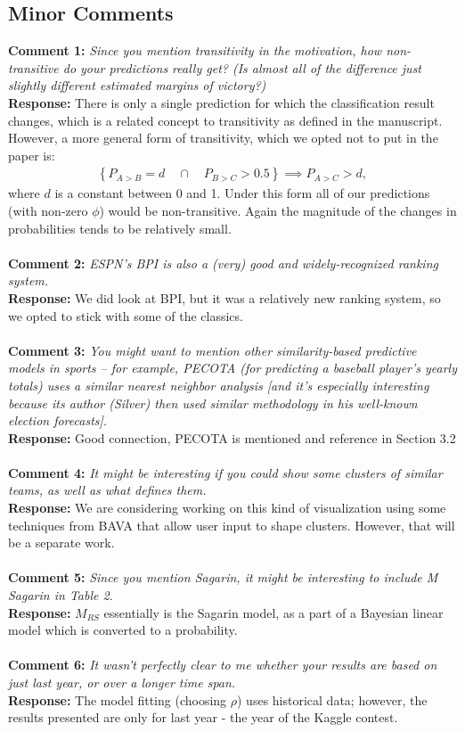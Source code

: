 \documentclass[11pt]{article} %
\begin{document}
\subsection*{Minor Comments}
{\bf Comment 1:} \emph{Since you mention transitivity in the motivation, how non-transitive do your predictions really get? (Is almost all of the difference just slightly different estimated margins of victory?)}\\
{\bf Response:} There is only a single prediction for which the classification result changes, which is a related concept to transitivity as defined in the manuscript. However, a more general form of transitivity, which we opted not to put in the paper is:
\begin{eqnarray*}
\left \{P_{A>B} =d \quad \cap \quad P_{B>C} > 0.5 \right\} \implies P_{A>C} >d,
\end{eqnarray*}
 where $d$ is a constant between 0 and 1. Under this form all of our predictions (with non-zero $\phi$) would be non-transitive. Again the magnitude of the changes in probabilities tends to be relatively small.\\
\\
{\bf Comment 2:} \emph{ESPN's BPI is also a (very) good and widely-recognized ranking system.}\\
{\bf Response:} We did look at BPI, but it was a relatively new ranking system, so we opted to stick with some of the classics. \\
\\
{\bf Comment 3:} \emph{You might want to mention other similarity-based predictive models in sports -- for example, PECOTA (for predicting a baseball player's yearly totals) uses a similar nearest neighbor analysis [and it's especially interesting because its author (Silver) then used similar methodology in his well-known election forecasts].}\\
{\bf Response:} Good connection, PECOTA is mentioned and reference in Section 3.2\\
\\
{\bf Comment 4:} \emph{It might be interesting if you could show some clusters of similar teams, as well as what defines them.}\\
{\bf Response:} We are considering working on this kind of visualization using some techniques from BAVA that allow user input to shape clusters. However, that will be a separate work. \\
\\
{\bf Comment 5:} \emph{Since you mention Sagarin, it might be interesting to include M Sagarin in Table 2.}\\
{\bf Response:} $M_{RS}$ essentially is the Sagarin model, as a part of a Bayesian linear model which is converted to a probability.\\
\\
{\bf Comment 6:} \emph{It wasn't perfectly clear to me whether your results are based on just last year, or over a longer time span.}\\
{\bf Response:} The model fitting (choosing $\rho$) uses historical data; however, the results presented are only for last year - the year of the Kaggle contest.
\end{document}
